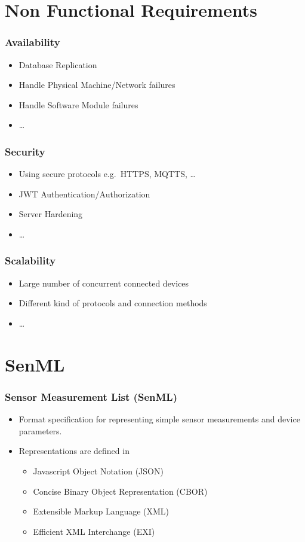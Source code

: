 \documentclass{../iot-lecture}
\begin{document}
\section{Non Functional Requirements}

\begin{frame}
  \frametitle{Availability}
  \begin{itemize}
    \item Database Replication
    \item Handle Physical Machine/Network failures
    \item Handle Software Module failures
    \item \ldots
  \end{itemize}
\end{frame}

\begin{frame}
  \frametitle{Security}
  \begin{itemize}
    \item Using secure protocols e.g.\ HTTPS, MQTTS, \ldots
    \item JWT Authentication/Authorization
    \item Server Hardening
    \item \ldots
  \end{itemize}
\end{frame}

\begin{frame}
  \frametitle{Scalability}
  \begin{itemize}
    \item Large number of concurrent connected devices
    \item Different kind of protocols and connection methods
    \item \ldots
  \end{itemize}
\end{frame}

\section{SenML}

\begin{frame}
  \frametitle{Sensor Measurement List (SenML)}
  \begin{itemize}
    \item Format specification for representing simple sensor measurements and device parameters.
    \item Representations are defined in
    \begin{itemize}
      \item Javascript Object Notation (JSON)
      \item Concise Binary Object Representation (CBOR)
      \item Extensible Markup Language (XML)
      \item Efficient XML Interchange (EXI)
    \end{itemize}
  \end{itemize}
\end{frame}
\end{document}
